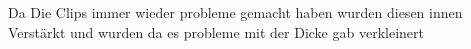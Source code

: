 \begin{inhalt}
Da Die Clips immer wieder probleme gemacht haben wurden diesen innen Verstärkt und wurden da es probleme mit der Dicke gab verkleinert 









\end{inhalt}